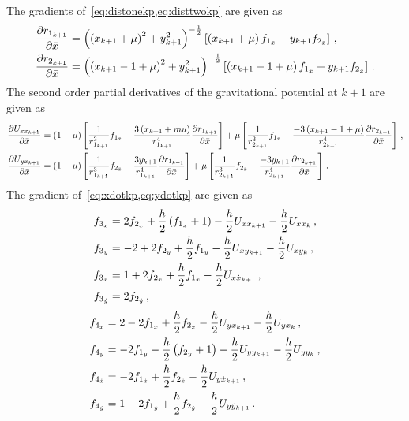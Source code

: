 \documentclass[smallcondensed]{svjour3}
\begin{document}
The gradients of~\cref{eq:distonekp,eq:disttwokp} are given as
\begin{subequations}\label{eq:distkp_grad}
\begin{align}
        \frac{\partial r_{1_{k+1}}}{\partial \bar{x}} &= \left( \left( x_{k+1} + \mu\right)^2 + y_{k+1}^2 \right)^{-\frac{1}{2}} \left[ \left( x_{k+1} + \mu \right) f_{1_{\bar{x}}} + y_{k+1} f_{2_{\bar{x}}} \right] \, ,\\
        \frac{\partial r_{2_{k+1}}}{\partial \bar{x}} &= \left( \left( x_{k+1} - 1 + \mu\right)^2 + y_{k+1}^2 \right)^{-\frac{1}{2}} \left[ \left( x_{k+1} -1 + \mu \right) f_{1_{\bar{x}}} + y_{k+1} f_{2_{\bar{x}}} \right]  \, .
\end{align}
\end{subequations}
The second order partial derivatives of the gravitational potential at \( k+1\) are given as
\begin{subequations}
\begin{align}
        \frac{\partial U_{xx_{k+1}}}{\partial \bar{x}} &= \left( 1-\mu \right)\left[ \frac{1}{r_{1_{k+1}}^3} f_{1_{\bar{x}}} - \frac{3 \left( x_{k+1} +mu \right)}{r_{1_{k+1}}^4} \frac{\partial r_{1_{k+1}}}{\partial \bar{x}} \right] + \mu \left[ \frac{1}{r_{2_{k+1}}^3} f_{1_{\bar{x}}} - \frac{-3 \left( x_{k+1} -1 + \mu \right)}{r_{2_{k+1}}^4} \frac{\partial r_{2_{k+1}}}{\partial \bar{x}} \right] \, ,\\
        \frac{\partial U_{yx_{k+1}}}{\partial \bar{x}} &= \left( 1-\mu \right)\left[ \frac{1}{r_{1_{k+1}}^3} f_{2_{\bar{x}}} - \frac{3 y_{k+1}}{r_{1_{k+1}}^4} \frac{\partial r_{1_{k+1}}}{\partial \bar{x}} \right] + \mu \left[ \frac{1}{r_{2_{k+1}}^3} f_{2_{\bar{x}}} - \frac{-3 y_{k+1}}{r_{2_{k+1}}^4} \frac{\partial r_{2_{k+1}}}{\partial \bar{x}} \right] \, .
\end{align}
\end{subequations}
The gradient of~\cref{eq:xdotkp,eq:ydotkp} are given as
\begin{subequations}\label{eq:xdotkp_grad}
\begin{align}
        f_{3_x} &= 2 f_{2_x} + \frac{h}{2} \left( f_{1_x} + 1 \right) - \frac{h}{2} U_{xx_{k+1}} - \frac{h}{2} U_{xx_k} \, ,\\
        f_{3_y} &= -2 + 2 f_{2_y} + \frac{h}{2} f_{1_y} - \frac{h}{2} U_{xy_{k+1}} -\frac{h}{2} U_{xy_{k}} \, ,\\
        f_{3_{\dot{x}}} &= 1 + 2 f_{2_{\dot{x}}} + \frac{h}{2} f_{1_{\dot{x}}} - \frac{h}{2} U_{x\dot{x}_{k+1}}\, ,\\
        f_{3_{\dot{y}}} &= 2 f_{2_{\dot{y}}}\, ,
\end{align}
\end{subequations}
\begin{subequations}\label{eq:ydotkp_grad}
\begin{align}
        f_{4_x} &= 2 - 2 f_{1_x} + \frac{h}{2} f_{2_x}  - \frac{h}{2} U_{yx_{k+1}} - \frac{h}{2} U_{yx_k} \, ,\\
        f_{4_y} &= -2f_{1_y}  - \frac{h}{2} \left( f_{2_y} + 1 \right) - \frac{h}{2} U_{yy_{k+1}} -\frac{h}{2} U_{yy_{k}} \, ,\\
        f_{4_{\dot{x}}} &= - 2 f_{1_{\dot{x}}} +  \frac{h}{2} f_{2_{\dot{x}}} - \frac{h}{2} U_{y\dot{x}_{k+1}}\, ,\\
        f_{4_{\dot{y}}} &= 1 - 2 f_{1_{\dot{y}}} + \frac{h}{2} f_{2_{\dot{y}}} - \frac{h}{2} U_{y\dot{y}_{k+1}}\, .
\end{align}
\end{subequations}
\end{document}
